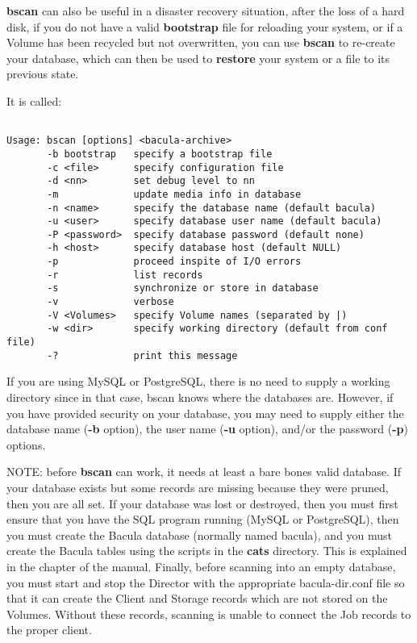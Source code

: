 {\bf bscan} can also be useful in a disaster recovery situation, after the
loss of a hard disk, if you do not have a valid {\bf bootstrap} file for
reloading your system, or if a Volume has been recycled but not overwritten,
you can use {\bf bscan} to re-create your database, which can then be used to
{\bf restore} your system or a file to its previous state.

It is called:

\footnotesize
\begin{verbatim}

Usage: bscan [options] <bacula-archive>
       -b bootstrap   specify a bootstrap file
       -c <file>      specify configuration file
       -d <nn>        set debug level to nn
       -m             update media info in database
       -n <name>      specify the database name (default bacula)
       -u <user>      specify database user name (default bacula)
       -P <password>  specify database password (default none)
       -h <host>      specify database host (default NULL)
       -p             proceed inspite of I/O errors
       -r             list records
       -s             synchronize or store in database
       -v             verbose
       -V <Volumes>   specify Volume names (separated by |)
       -w <dir>       specify working directory (default from conf file)
       -?             print this message
\end{verbatim}
\normalsize

If you are using MySQL or PostgreSQL, there is no need to supply a working
directory since in that case, bscan knows where the databases are. However, if
you have provided security on your database, you may need to supply either the
database name ({\bf -b} option), the user name ({\bf -u} option), and/or the
password ({\bf -p}) options.

NOTE: before {\bf bscan} can work, it needs at least a bare bones valid
database.  If your database exists but some records are missing because
they were pruned, then you are all set. If your database was lost or
destroyed, then you must first ensure that you have the SQL program running
(MySQL or PostgreSQL), then you must create the Bacula database (normally
named bacula), and you must create the Bacula tables using the scripts in
the {\bf cats} directory.  This is explained in the
 chapter of the manual. Finally, before
scanning into an empty database, you must start and stop the Director with
the appropriate bacula-dir.conf file so that it can create the Client and
Storage records which are not stored on the Volumes.  Without these
records, scanning is unable to connect the Job records to the proper
client.

